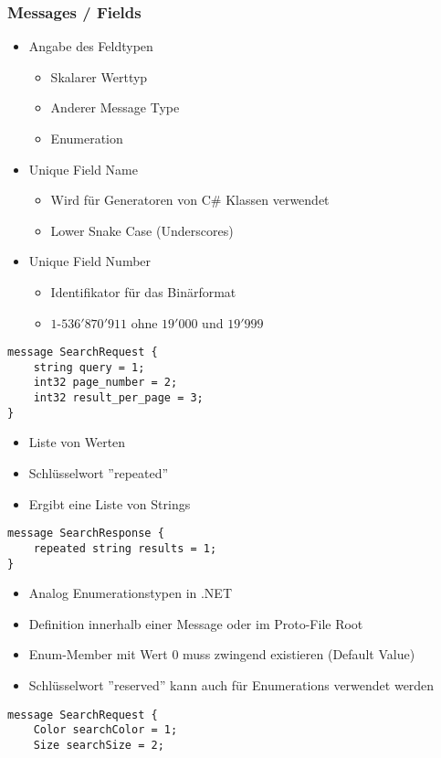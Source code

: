 \begin{multicols*}{2}
\subsubsection{Messages / Fields}
\begin{itemize}
    \item Angabe des Feldtypen
    \begin{itemize}
        \item Skalarer Werttyp
        \item Anderer Message Type
        \item Enumeration
    \end{itemize}
    \item Unique Field Name
    \begin{itemize}
        \item Wird für Generatoren von C\# Klassen verwendet
        \item Lower Snake Case (Underscores)
    \end{itemize}
    \item Unique Field Number
    \begin{itemize}
        \item Identifikator für das Binärformat
        \item $1$-$536'870'911$ ohne $19'000$ und $19'999$
    \end{itemize}
\end{itemize}
\begin{lstlisting}
message SearchRequest { 
    string query = 1;
    int32 page_number = 2; 
    int32 result_per_page = 3;
}   
\end{lstlisting}
\begin{itemize}
    \item Liste von Werten
    \item Schlüsselwort ''repeated''
    \item Ergibt eine Liste von Strings
\end{itemize}
\begin{lstlisting}
message SearchResponse {
    repeated string results = 1;
}
\end{lstlisting}
\begin{itemize}
    \item Analog Enumerationstypen in .NET
    \item Definition innerhalb einer Message oder im Proto-File Root
    \item Enum-Member mit Wert 0 muss zwingend existieren (Default Value)
    \item Schlüsselwort ''reserved'' kann auch für Enumerations verwendet werden
\end{itemize}
\begin{lstlisting}
message SearchRequest { 
    Color searchColor = 1; 
    Size searchSize = 2;
    

\end{lstlisting}
\end{multicols*}
